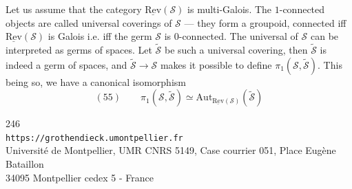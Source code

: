 Let us assume   that the category $\underline{\mathrm{Rev}}(\mathcal S)$ is  multi-Galois. The $1$-connected objects are called universal coverings of $\mathcal S$ ---  they form a groupoid, connected iff $\underline{\mathrm{Rev}}(\mathcal S)$ is Galois i.e. iff the germ $\mathcal S$ is $0$-connected. The universal  of $\mathcal S$ can be interpreted as germs of spaces. Let $\widetilde{\mathcal S}$ be such a universal covering, then $\widetilde{\mathcal S}$ is indeed a  germ of spaces, and $\widetilde{\mathcal S}\longrightarrow\mathcal S$ makes it possible to define $\pi_1(\mathcal S,\widetilde{\mathcal S})$. This being so, we have a canonical isomorphism
\[
(55)\qquad \pi_1(\mathcal S,\widetilde{\mathcal S})\simeq\mathrm{Aut}_{\underline{\mathrm{Rev}}(\mathcal S)}(\widetilde{\mathcal S})
\]




\begin{center}
246\\
\texttt{https://grothendieck.umontpellier.fr}\\
Université de Montpellier, UMR CNRS 5149, Case courrier 051, Place Eugène Bataillon\\
34095 Montpellier cedex 5 - France
\end{center}